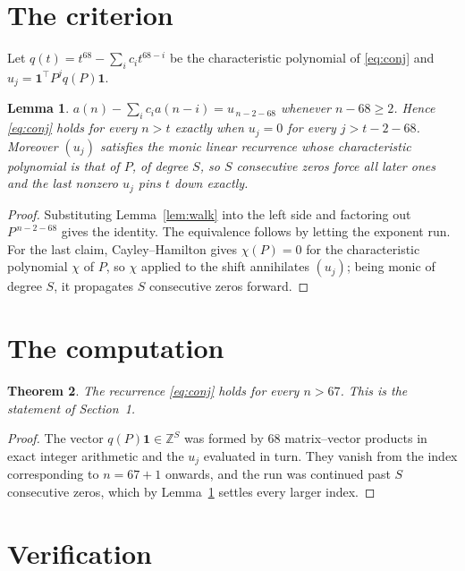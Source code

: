 \documentclass[11pt,a4paper]{article}
\theoremstyle{plain}
\newtheorem{theorem}{Theorem}
\newtheorem{lemma}[theorem]{Lemma}
\theoremstyle{definition}
\begin{document}
\section{The criterion}

Let $q(t)=t^{68}-\sum_i c_i t^{68-i}$ be the characteristic polynomial of
\eqref{eq:conj} and $u_j=\mathbf{1}^{\!\top}P^{j}q(P)\mathbf{1}$.

\begin{lemma}\label{lem:crit}
$a(n)-\sum_i c_i a(n-i)=u_{\,n-2-68}$ whenever $n-68\ge2$. Hence
\eqref{eq:conj} holds for every $n>t$ exactly when $u_j=0$ for every
$j>t-2-68$. Moreover $(u_j)$ satisfies the monic linear recurrence whose
characteristic polynomial is that of $P$, of degree $S$, so $S$ consecutive zeros force all
later ones and the last nonzero $u_j$ pins $t$ down exactly.
\end{lemma}

\begin{proof}
Substituting Lemma~\ref{lem:walk} into the left side and factoring out
$P^{\,n-2-68}$ gives the identity. The equivalence follows by letting the exponent
run. For the last claim, Cayley--Hamilton gives $\chi(P)=0$ for the characteristic
polynomial $\chi$ of $P$, so $\chi$ applied to the shift annihilates $(u_j)$; being monic of
degree $S$, it propagates $S$ consecutive zeros forward.
\end{proof}

\section{The computation}

\begin{theorem}
The recurrence \eqref{eq:conj} holds for every $n>67$. This is the statement of
Section~1.
\end{theorem}

\begin{proof}
The vector $q(P)\mathbf{1}\in\mathbb{Z}^{S}$ was formed by $68$ matrix--vector
products in exact integer arithmetic and the $u_j$ evaluated in turn. They vanish from the
index corresponding to $n=67+1$ onwards, and the run was continued past $S$ consecutive
zeros, which by Lemma~\ref{lem:crit} settles every larger index.
\end{proof}

\section{Verification}
\end{document}
